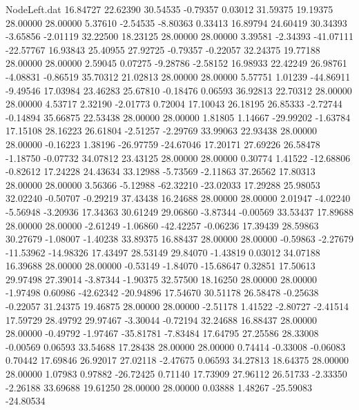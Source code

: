 \begin{filecontents}{NodeLeft.dat}
  16.84727   22.62390   30.54535    -0.79357    0.03012   31.59375   19.19375   28.00000   28.00000    5.37610   -2.54535   -8.80363    0.33413
  16.89794   24.60419   30.34393    -3.65856   -2.01119   32.22500   18.23125   28.00000   28.00000    3.39581   -2.34393  -41.07111  -22.57767
  16.93843   25.40955   27.92725    -0.79357   -0.22057   32.24375   19.77188   28.00000   28.00000    2.59045    0.07275   -9.28786   -2.58152
  16.98933   22.42249   26.98761    -4.08831   -0.86519   35.70312   21.02813   28.00000   28.00000    5.57751    1.01239  -44.86911   -9.49546
  17.03984   23.46283   25.67810    -0.18476    0.06593   36.92813   22.70312   28.00000   28.00000    4.53717    2.32190   -2.01773    0.72004
  17.10043   26.18195   26.85333    -2.72744   -0.14894   35.66875   22.53438   28.00000   28.00000    1.81805    1.14667  -29.99202   -1.63784
  17.15108   28.16223   26.61804    -2.51257   -2.29769   33.99063   22.93438   28.00000   28.00000   -0.16223    1.38196  -26.97759  -24.67046
  17.20171   27.69226   26.58478    -1.18750   -0.07732   34.07812   23.43125   28.00000   28.00000    0.30774    1.41522  -12.68806   -0.82612
  17.24228   24.43634   33.12988    -5.73569   -2.11863   37.26562   17.80313   28.00000   28.00000    3.56366   -5.12988  -62.32210  -23.02033
  17.29288   25.98053   32.02240    -0.50707   -0.29219   37.43438   16.24688   28.00000   28.00000    2.01947   -4.02240   -5.56948   -3.20936
  17.34363   30.61249   29.06860    -3.87344   -0.00569   33.53437   17.89688   28.00000   28.00000   -2.61249   -1.06860  -42.42257   -0.06236
  17.39439   28.59863   30.27679    -1.08007   -1.40238   33.89375   16.88437   28.00000   28.00000   -0.59863   -2.27679  -11.53962  -14.98326
  17.43497   28.53149   29.84070    -1.43819    0.03012   34.07188   16.39688   28.00000   28.00000   -0.53149   -1.84070  -15.68647    0.32851
  17.50613   29.97498   27.39014    -3.87344   -1.90375   32.57500   18.16250   28.00000   28.00000   -1.97498    0.60986  -42.62342  -20.94896
  17.54670   30.51178   26.58478    -0.25638   -0.22057   31.24375   19.46875   28.00000   28.00000   -2.51178    1.41522   -2.80727   -2.41514
  17.59729   28.49792   29.97467    -3.30044   -0.72194   32.24688   16.88437   28.00000   28.00000   -0.49792   -1.97467  -35.81781   -7.83484
  17.64795   27.25586   28.33008    -0.00569    0.06593   33.54688   17.28438   28.00000   28.00000    0.74414   -0.33008   -0.06083    0.70442
  17.69846   26.92017   27.02118    -2.47675    0.06593   34.27813   18.64375   28.00000   28.00000    1.07983    0.97882  -26.72425    0.71140
  17.73909   27.96112   26.51733    -2.33350   -2.26188   33.69688   19.61250   28.00000   28.00000    0.03888    1.48267  -25.59083  -24.80534

\end{filecontents}
